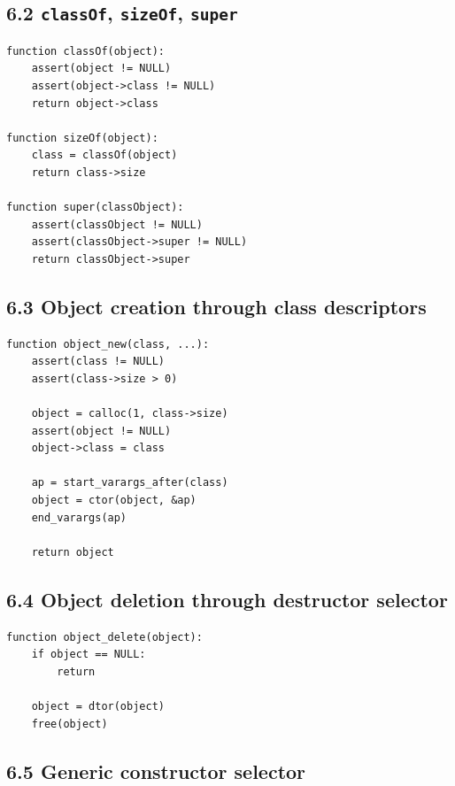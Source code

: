\documentclass[11pt]{article}
\begin{document}
\subsection{\texorpdfstring{6.2 \texttt{classOf}, \texttt{sizeOf},
\texttt{super}}{6.2 classOf, sizeOf, super}}\label{classof-sizeof-super}

\begin{verbatim}
function classOf(object):
    assert(object != NULL)
    assert(object->class != NULL)
    return object->class

function sizeOf(object):
    class = classOf(object)
    return class->size

function super(classObject):
    assert(classObject != NULL)
    assert(classObject->super != NULL)
    return classObject->super
\end{verbatim}

\subsection{6.3 Object creation through class
descriptors}\label{object-creation-through-class-descriptors}

\begin{verbatim}
function object_new(class, ...):
    assert(class != NULL)
    assert(class->size > 0)

    object = calloc(1, class->size)
    assert(object != NULL)
    object->class = class

    ap = start_varargs_after(class)
    object = ctor(object, &ap)
    end_varargs(ap)

    return object
\end{verbatim}

\subsection{6.4 Object deletion through destructor
selector}\label{object-deletion-through-destructor-selector}

\begin{verbatim}
function object_delete(object):
    if object == NULL:
        return

    object = dtor(object)
    free(object)
\end{verbatim}

\subsection{6.5 Generic constructor
selector}\label{generic-constructor-selector}
\end{document}
